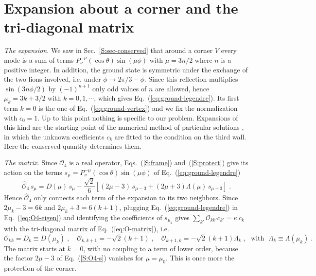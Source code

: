 \section{Expansion about a corner and the tri-diagonal matrix} \label{S:sec-matrix}

\emph{The expansion.} We saw in Sec.~\ref{S:sec-conserved} that around a corner $V$ every mode is a sum of terms $P_\nu^{-\mu}(\cos \theta) \sin(\mu \phi)$ with $\mu = 3n/2$ where $n$ is a positive integer. In addition, the ground state is symmetric under the exchange of the two lions involved, i.e. under $\phi \to 2\pi/3 - \phi$. Since this reflection multiplies $\sin(3 n \phi/2)$ by $(-1)^{n+1}$ only odd values of $n$ are allowed, hence $\mu_k = 3k + 3/2$ with $k = 0, 1, \cdots$, which gives Eq.~(\ref{eq:ground-legendre}). Its first term $k = 0$ is the one of Eq.~(\ref{eq:ground-vertex}) and we fix the normalization with $c_0 = 1$. Up to this point nothing is specific to our problem. Expansions of this kind are the starting point of the numerical method of particular solutions \cite{FHM67,BT05}, in which the unknown coefficients $c_k$ are fitted to the condition on the third wall. Here the conserved quantity determines them.

\emph{The matrix.} Since $\hat{\mathcal{O}}_4$ is a real operator, Eqs.~(\ref{S:frame}) and~(\ref{S:protect}) give its action on the terms $s_\mu = P_\nu^{-\mu}(\cos \theta) \sin(\mu \phi)$ of Eq.~(\ref{eq:ground-legendre})
\begin{equation} \label{S:O4-s}
    \hat{\mathcal{O}}_4 \, s_\mu = D(\mu) \, s_\mu - \frac{\sqrt{2}}{6} \left[ (2 \mu - 3) \, s_{\mu - 3} + (2 \mu + 3) \Lambda(\mu) \, s_{\mu + 3} \right] \;.
\end{equation}
Hence $\hat{\mathcal{O}}_4$ only connects each term of the expansion to its two neighbors. Since $2 \mu_k - 3 = 6k$ and $2 \mu_k + 3 = 6(k+1)$, plugging Eq.~(\ref{eq:ground-legendre}) in Eq.~(\ref{eq:O4-eigen}) and identifying the coefficients of $s_{\mu_k}$ gives $\sum_{k'} \mathcal{O}_{k k'} c_{k'} = \kappa \, c_k$ with the tri-diagonal matrix of Eq.~(\ref{eq:O-matrix}), i.e.
\begin{equation} \label{S:matrix-elements}
    \mathcal{O}_{k k} = D_k \equiv D(\mu_k) \;, \quad \mathcal{O}_{k, k+1} = - \sqrt{2} (k + 1) \;, \quad \mathcal{O}_{k+1, k} = - \sqrt{2} (k + 1) \Lambda_k \;, \mbox{~~with~~} \Lambda_k \equiv \Lambda(\mu_k) \;.
\end{equation}
The matrix starts at $k = 0$, with no coupling to a term of lower order, because the factor $2 \mu - 3$ of Eq.~(\ref{S:O4-s}) vanishes for $\mu = \mu_0$. This is once more the protection of the corner.

